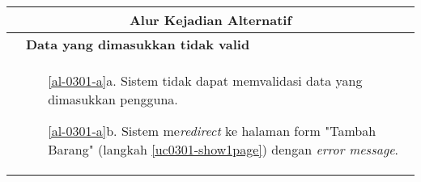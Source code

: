 \begin{table}[H]
\begin{tabular}{|r|p{8cm}|}
		\multicolumn{2}{|c|}{\textbf{Alur Kejadian Alternatif}}                                                         \\ \hline
		\multicolumn{1}{|l|}{}                                           & \textbf{Data yang dimasukkan tidak valid}
			\\ \hline
		\multicolumn{1}{|l|}{}                                           & 
			 \begin{itemize}
			 	\item[\ref{al-0301-a}a.] Sistem tidak dapat memvalidasi data yang dimasukkan pengguna.
			 	\item[\ref{al-0301-a}b.] Sistem me\textit{redirect} ke halaman form "Tambah Barang" (langkah \ref{uc0301-show1page}) dengan \textit{error message}.
			 \end{itemize}
		 \\ \hline
	\end{tabular}
\end{table}